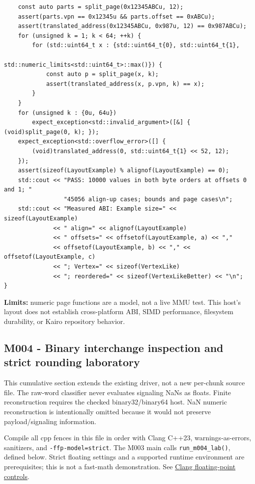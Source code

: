\begin{verbatim}
    const auto parts = split_page(0x12345ABCu, 12);
    assert(parts.vpn == 0x12345u && parts.offset == 0xABCu);
    assert(translated_address(0x12345ABCu, 0x987u, 12) == 0x987ABCu);
    for (unsigned k = 1; k < 64; ++k) {
        for (std::uint64_t x : {std::uint64_t{0}, std::uint64_t{1},
                                std::numeric_limits<std::uint64_t>::max()}) {
            const auto p = split_page(x, k);
            assert(translated_address(x, p.vpn, k) == x);
        }
    }
    for (unsigned k : {0u, 64u})
        expect_exception<std::invalid_argument>([&] { (void)split_page(0, k); });
    expect_exception<std::overflow_error>([] {
        (void)translated_address(0, std::uint64_t{1} << 52, 12);
    });
    assert(sizeof(LayoutExample) % alignof(LayoutExample) == 0);
    std::cout << "PASS: 10000 values in both byte orders at offsets 0 and 1; "
                 "45056 align-up cases; bounds and page cases\n";
    std::cout << "Measured ABI: Example size=" << sizeof(LayoutExample)
              << " align=" << alignof(LayoutExample)
              << " offsets=" << offsetof(LayoutExample, a) << ","
              << offsetof(LayoutExample, b) << "," << offsetof(LayoutExample, c)
              << "; Vertex=" << sizeof(VertexLike)
              << "; reordered=" << sizeof(VertexLikeBetter) << "\n";
}
\end{verbatim}

\textbf{Limits:} numeric page functions are a model, not a live MMU test. This host's layout does not establish cross-platform ABI, SIMD performance, filesystem durability, or Kairo repository behavior.

\subsection{M004 - Binary interchange inspection and strict rounding laboratory}\label{appendix-4e2236f53445-m004---binary-interchange-inspection-and-strict-rounding-laboratory}

\hypertarget{appendix-4e2236f53445-m004---binary-interchange-inspection-and-strict-rounding-laboratory}{}

This cumulative section extends the existing driver, not a new per-chunk source file. The raw-word classifier never evaluates signaling NaNs as floats. Finite reconstruction requires the checked binary32/binary64 host. NaN numeric reconstruction is intentionally omitted because it would not preserve payload/signaling information.

Compile all cpp fences in this file in order with Clang C++23, warnings-as-errors, sanitizers, and \texttt{-ffp-model=strict}. The M003 main calls \texttt{run\_m004\_lab()}, defined below. Strict floating settings and a supported runtime environment are prerequisites; this is not a fast-math demonstration. See \href{https://clang.llvm.org/docs/UsersManual.html\#controlling-floating-point-behavior}{Clang floating-point controls}.

